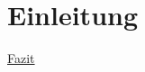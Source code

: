 \chapter{Einleitung}\label{ch:intro}
\hyperref[ch:conclusion]{Fazit}

\autocite{CleanCode}
\newline \autocite[S.12]{CleanCode}
\newline \autocite[vgl.][S.12]{CleanCode}

\tk
\\
\json